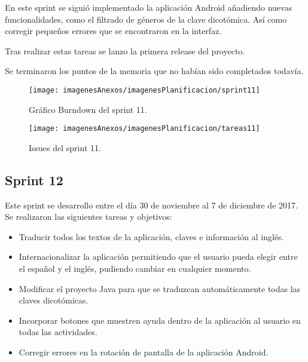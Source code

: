 En este sprint se siguió implementado la aplicación Android añadiendo nuevas funcionalidades, como el filtrado de géneros de la clave dicotómica. Así como corregir pequeños errores que se encontraron en la interfaz.

Tras realizar estas tareas se lanzo la primera release del proyecto.

Se terminaron los puntos de la memoria que no habían sido completados todavía.

\begin{figure}[h]
    \begin{center}%
        \begin{center}%
          \texttt{[image: imagenesAnexos/imagenesPlanificacion/sprint11]}%
          \caption{Gráfico Burndown del sprint 11.}%
          \label{figSprint11}%
        \end{center}%
  	\end{center}%
\end{figure}%

\begin{figure}[h]
    \begin{center}%
        \begin{center}%
          \texttt{[image: imagenesAnexos/imagenesPlanificacion/tareas11]}%
          \caption{Issues del sprint 11.}%
          \label{figTareas11}%
        \end{center}%
  	\end{center}%
\end{figure}%

\newpage

\subsection{Sprint 12}

Este sprint se desarrollo entre el día 30 de noviembre al 7 de diciembre de 2017. Se realizaron las siguientes tareas y objetivos:

\begin{itemize}
	\item Traducir todos los textos de la aplicación, claves e información al inglés.
	\item Internacionalizar la aplicación permitiendo que el usuario pueda elegir entre el español y el inglés, pudiendo cambiar en cualquier momento.
	\item Modificar el proyecto Java para que se traduzcan automáticamente todas las claves dicotómicas.
	\item Incorporar botones que muestren ayuda dentro de la aplicación al usuario en todas las actividades.
	\item Corregir errores en la rotación de pantalla de la aplicación Android.
\end{itemize}

